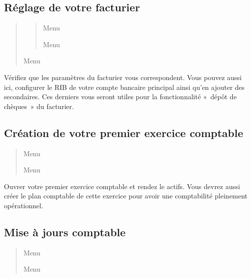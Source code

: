 \documentclass[a4paper,10pt,oneside,french]{sphinxmanual}
\begin{document}
\subsection{Réglage de votre facturier}
\label{\detokenize{pro/first_step:reglage-de-votre-facturier}}\begin{quote}
\begin{quote}

\sphinxAtStartPar
Menu 

\sphinxAtStartPar
Menu 
\end{quote}

\sphinxAtStartPar
Menu 
\end{quote}

\sphinxAtStartPar
Vérifiez que les paramètres du facturier vous correspondent.
Vous pouvez aussi ici, configurer le RIB de votre compte bancaire principal ainsi qu’en ajouter des secondaires.
Ces derniers vous seront utiles pour la fonctionnalité « dépôt de chèques » du facturier.


\subsection{Création de votre premier exercice comptable}
\label{\detokenize{pro/first_step:creation-de-votre-premier-exercice-comptable}}\begin{quote}

\sphinxAtStartPar
Menu 

\sphinxAtStartPar
Menu 
\end{quote}

\sphinxAtStartPar
Ouvrer votre premier exercice comptable et rendez le actifs.
Vous devrez aussi créer le plan comptable de cette exercice pour avoir une comptabilité pleinement opérationnel.


\subsection{Mise à jours comptable}
\label{\detokenize{pro/first_step:mise-a-jours-comptable}}\begin{quote}

\sphinxAtStartPar
Menu 

\sphinxAtStartPar
Menu 
\end{quote}
\end{document}
